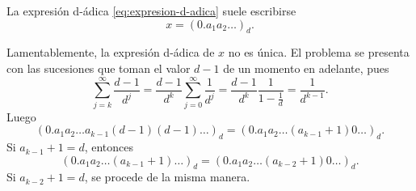\begin{subappendices}
La expresi\'on d-\'adica \eqref{eq:expresion-d-adica} suele escribirse
\[
x=\left(0.a_1a_2\ldots\right)_d.
\]

Lamentablemente, la expresi\'on d-\'adica de $x$ no es \'unica. El problema se presenta con las sucesiones que toman el valor $d-1$ de un momento en adelante, pues
\[
\sum\limits_{j=k}^{\infty} \frac{d-1}{d^j}=
\frac{d-1}{d^k} \sum\limits_{j=0}^{\infty} \frac{1}{d^j}=
\frac{d-1}{d^k} \frac{1}{1-\frac{1}{d}}=\frac{1}{d^{k-1}}.
\]
Luego
\[
\left(0.a_1a_2\ldots a_{k-1} (d-1) (d-1)\dots\right)_d =
\left(0.a_1a_2\ldots (a_{k-1} +1) 0\dots\right)_d.
\]
 Si $a_{k-1}+1=d$, entonces 
 \[
 \left(0.a_1a_2\ldots (a_{k-1} +1)\dots\right)_d=
 \left(0.a_1a_2\ldots (a_{k-2} +1) 0\dots\right)_d.
\]
Si $a_{k-2}+1=d$, se procede de la misma manera. 

\end{subappendices}

 
